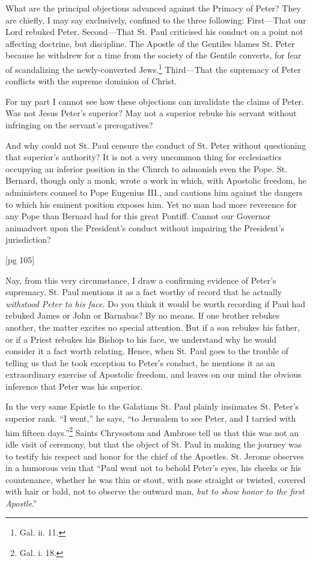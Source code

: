 What are the principal objections advanced
against the Primacy of Peter? They are chiefly,
I may say exclusively, confined to the three following:
First—That our Lord rebuked Peter.
Second—That St. Paul criticised his conduct on
a point not affecting doctrine, but discipline. The
Apostle of the Gentiles blames St. Peter because
he withdrew for a time from the society of the
Gentile converts, for fear of scandalizing the
newly-converted Jews.\footnote{Gal. ii.
11.} Third—That the supremacy
of Peter conflicts with the supreme dominion
of Christ.

For my part I cannot see how these objections
can invalidate the claims of Peter. Was not Jesus
Peter's superior? May not a superior rebuke his
servant without infringing on the servant's prerogatives?

And why could not St. Paul censure the conduct
of St. Peter without questioning that superior's
authority? It is not a very uncommon thing for
ecclesiastics occupying an inferior position in the
Church to admonish even the Pope. St. Bernard,
though only a monk, wrote a work in which, with
Apostolic freedom, he administers counsel to Pope
Eugenius III., and cautions him against the dangers
to which his eminent position exposes him.
Yet no man had more reverence for any Pope than
Bernard had for this great Pontiff. Cannot our
Governor animadvert upon the President's conduct
without impairing the President's jurisdiction?

[pg 105]

Nay, from this very circumstance, I draw a
confirming evidence of Peter's supremacy. St.
Paul mentions it as a fact worthy of record that
he actually \emph{withstood Peter to his face}. Do you
think it would be worth recording if Paul had rebuked
James or John or Barnabas? By no means.
If one brother rebukes another, the matter excites
no special attention. But if a son rebukes
his father, or if a Priest rebukes his Bishop to his
face, we understand why he would consider it a
fact worth relating. Hence, when St. Paul goes
to the trouble of telling us that he took exception
to Peter's conduct, he mentions it as an extraordinary
exercise of Apostolic freedom, and
leaves on our mind the obvious inference that
Peter was his superior.

In the very same Epistle to the Galatians St.
Paul plainly insinuates St. Peter's superior rank.
“I went,” he says, “to Jerusalem to see Peter,
and I tarried with him fifteen days.”\footnote{Gal.
i. 18.} Saints
Chrysostom and Ambrose tell us that this was not
an idle visit of ceremony, but that the object of St.
Paul in making the journey was to testify his respect
and honor for the chief of the Apostles. St.
Jerome observes in a humorous vein that “Paul
went not to behold Peter's eyes, his cheeks or his
countenance, whether he was thin or stout, with
nose straight or twisted, covered with hair or bald,
not to observe the outward man, \emph{but to show honor
to the first Apostle}.”

